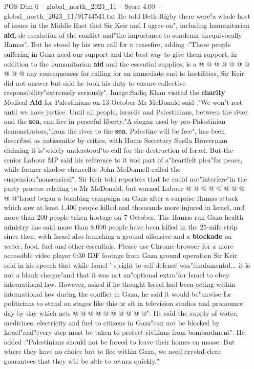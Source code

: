 \begin{textsample}{POS Dim 6 – global\_north\_2023\_11 – Score 4.00 – global\_north\_2023\_11/91744541.txt}
He told Beth Rigby there were"a whole host of issues in the Middle East that Sir Keir and I agree on", including humanitarian \textbf{aid}, de-escalation of the conflict and"the importance to condemn unequivocally Hamas".
But he stood by his own call for a ceasefire, adding :"Those people suffering in Gaza need our support and the best way to give them support, in addition to the humanitarian \textbf{aid} and the essential supplies, is a @ @ @ @ @ @ @ @ @ @ any consequences for calling for an immediate end to hostilities, Sir Keir did not answer but said he took his duty to ensure collective responsibility"extremely seriously".
Image:Sadiq Khan visited the \textbf{charity} Medical \textbf{Aid} for Palestinians on 13 October Mr McDonald said :"We won't rest until we have justice.
Until all people, Israelis and Palestinians, between the river and the \textbf{sea}, can live in peaceful liberty."A slogan used by pro-Palestinian demonstrators,"from the river to the \textbf{sea}, Palestine will be free", has been described as antisemitic by critics, with Home Secretary Suella Braverman claiming it is"widely understood"to call for the destruction of Israel.
But the senior Labour MP said his reference to it was part of a"heartfelt plea"for peace, while former shadow chancellor John McDonnell called the suspension"nonsensical".
Sir Keir told reporters that he could not"interfere"in the party process relating to Mr McDonald, but warned Labour @ @ @ @ @ @ @ @ @ @"Israel began a bombing campaign on Gaza after a surprise Hamas attack which saw at least 1,400 people killed and thousands more injured in Israel, and more than 200 people taken hostage on 7 October.
The Hamas-run Gaza health ministry has said more than 8,000 people have been killed in the 25-mile strip since then, with Israel also launching a ground offensive and a \textbf{blockade} on water, food, fuel and other essentials.
Please use Chrome browser for a more accessible video player 0:30 IDF footage from Gaza ground operation Sir Keir said in his speech that while Israel ' s right to self-defence was"fundamental... it is not a blank cheque"and that it was not an"optional extra"for Israel to obey international law.
However, asked if he thought Israel had been acting within international law during the conflict in Gaza, he said it would be"unwise for politicians to stand on stages like this or sit in television studios and pronounce day by day which acts @ @ @ @ @ @ @ @ @ @".
He said the supply of water, medicines, electricity and fuel to citizens in Gaza"can not be blocked by Israel"and"every step must be taken to protect civilians from bombardment".
He added :"Palestinians should not be forced to leave their homes en masse.
But where they have no choice but to flee within Gaza, we need crystal-clear guarantees that they will be able to return quickly."

\end{textsample}
